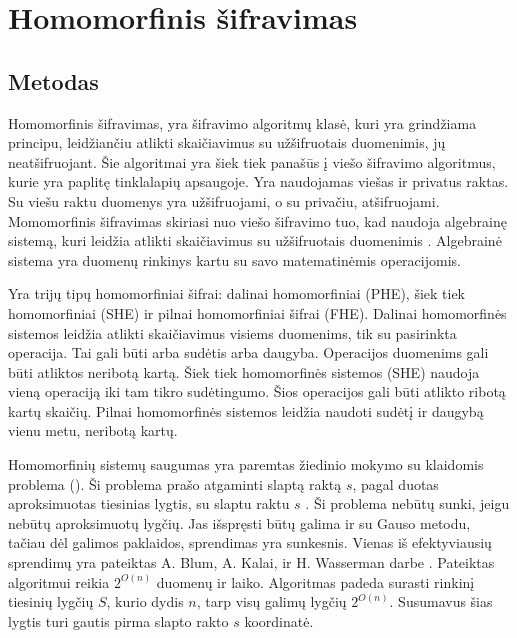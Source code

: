 \documentclass{VUMIFInfBakalaurinis}
\begin{document}
\section{Homomorfinis šifravimas}
\subsection{Metodas}
\par Homomorfinis šifravimas, yra šifravimo algoritmų klasė, kuri yra grindžiama principu, leidžiančiu atlikti skaičiavimus su užšifruotais duomenimis, jų neatšifruojant. Šie algoritmai yra šiek tiek panašūs į viešo šifravimo algoritmus, kurie yra paplitę tinklalapių apsaugoje. Yra naudojamas viešas ir privatus raktas. Su viešu raktu duomenys yra užšifruojami, o su privačiu, atšifruojami. Momomorfinis šifravimas skiriasi nuo viešo šifravimo tuo, kad naudoja algebrainę sistemą, kuri leidžia atlikti skaičiavimus su užšifruotais duomenimis \cite{14}. Algebrainė sistema yra duomenų rinkinys kartu su savo matematinėmis operacijomis.
\par Yra trijų tipų homomorfiniai šifrai: dalinai homomorfiniai (PHE), šiek tiek homomorfiniai (SHE) ir pilnai homomorfiniai šifrai (FHE). Dalinai homomorfinės sistemos leidžia atlikti skaičiavimus visiems duomenims, tik su pasirinkta operacija. Tai gali būti arba sudėtis arba daugyba.  Operacijos duomenims gali būti atliktos neribotą kartą.  Šiek tiek homomorfinės sistemos (SHE) naudoja vieną operaciją iki tam tikro sudėtingumo. Šios operacijos gali būti atlikto ribotą kartų skaičių. Pilnai homomorfinės sistemos leidžia naudoti sudėtį ir daugybą vienu metu, neribotą kartų. 
\par Homomorfinių sistemų saugumas yra paremtas žiedinio mokymo su klaidomis problema (). Ši problema prašo atgaminti slaptą raktą $s$, pagal duotas aproksimuotas tiesinias lygtis, su slaptu raktu $s$ \cite{16}. Ši problema nebūtų sunki, jeigu nebūtų aproksimuotų lygčių. Jas išspręsti būtų galima ir su Gauso metodu, tačiau dėl galimos paklaidos, sprendimas yra sunkesnis. Vienas iš efektyviausių sprendimų yra pateiktas A. Blum, A. Kalai, ir H. Wasserman darbe \cite{15}. Pateiktas algoritmui reikia $2^{O(n)}$ duomenų ir laiko. Algoritmas padeda surasti rinkinį tiesinių lygčių $S$, kurio dydis $n$, tarp visų galimų lygčių $2^{O(n)}$. Susumavus šias lygtis turi gautis pirma slapto rakto $s$ koordinatė.
\end{document}
